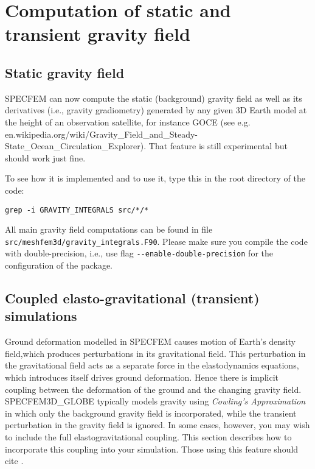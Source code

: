 
\chapter{Computation of static and transient gravity field}

\section{Static gravity field}

SPECFEM can now compute the static (background) gravity field as well as 
its derivatives (i.e., gravity gradiometry)
generated by any given 3D Earth model at the height 
of an observation satellite, for instance GOCE\newline
(see e.g. en.wikipedia.org/wiki/Gravity\_Field\_and\_Steady-State\_Ocean\_Circulation\_Explorer).\newline
That feature is still experimental but should work just fine.\newline


\noindent
To see how it is implemented and to use it, type this in the root directory of the code:
\begin{verbatim}
grep -i GRAVITY_INTEGRALS src/*/*
\end{verbatim}
All main gravity field computations can be found in file \texttt{src/meshfem3d/gravity\_integrals.F90}.
Please make sure you compile the code with double-precision, i.e., use flag \texttt{{-}{-}enable-double-precision} for the
configuration of the package.

\section{Coupled elasto-gravitational (transient) simulations}

Ground deformation modelled in SPECFEM causes motion of 
Earth's density field,which produces perturbations in its 
gravitational field. This perturbation in the gravitational 
field acts as a separate force in the elastodynamics 
equations, which introduces itself drives ground deformation.
 Hence there is implicit coupling between the deformation 
 of the ground and the changing gravity field. SPECFEM3D\_GLOBE  
 typically models gravity using \textit{Cowling's Approximation}
 in which only the background gravity field is incorporated, 
 while the transient perturbation in the gravity field is 
 ignored. In some cases, however, you may wish to include the 
 full elastogravitational coupling. This section describes
 how to incorporate this coupling into your simulation. 
 Those using this feature should cite \cite{GhEaTr23}. 


